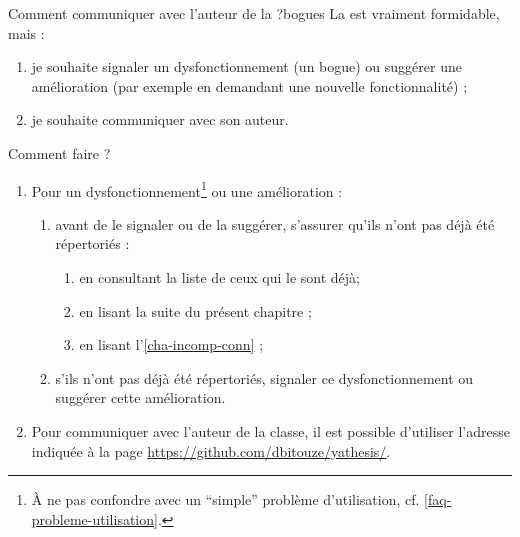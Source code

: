 \begin{dbfaq}{Comment communiquer avec l'auteur de la \yatCl{} ?}{bogues}
  La \yatCl{} est vraiment formidable, mais :
  \begin{enumerate}
  \item je souhaite signaler un dysfonctionnement (un bogue) ou suggérer une amélioration
    (par exemple en demandant une nouvelle fonctionnalité) ;
  \item je souhaite communiquer avec son auteur.
  \end{enumerate}
  Comment faire ?
  \tcblower
  \begin{enumerate}
  \item Pour un dysfonctionnement\footnote{À ne pas confondre avec un
      \enquote{simple} problème d'utilisation, cf. \vref{faq-probleme-utilisation}.}
    ou une amélioration :
    \begin{enumerate}
    \item avant de le signaler ou de la suggérer, s'assurer qu'ils n'ont pas
      déjà été répertoriés :
      \begin{enumerate}
      \item en consultant la liste de ceux qui le sont déjà\issues ;
      \item en lisant la suite du présent chapitre ;
      \item en lisant l'\vref{cha-incomp-conn} ;
      \end{enumerate}
    \item s'ils n'ont pas déjà été répertoriés, signaler ce
      dysfonctionnement\ecm{} ou suggérer cette amélioration\newissues{}.
    \end{enumerate}
  \item Pour communiquer avec l'auteur de la classe, il est possible d'utiliser
    l'adresse indiquée à la page \url{https://github.com/dbitouze/yathesis/}.
  \end{enumerate}
\end{dbfaq}

